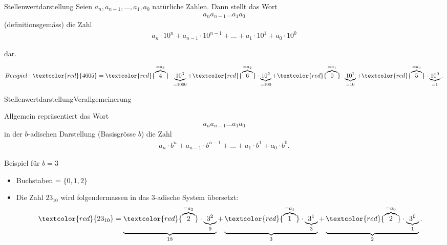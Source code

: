 \begin{frame}{Stellenwertdarstellung}
    Seien $a_n,a_{n-1},\ldots,a_1,a_0$ natürliche Zahlen. Dann stellt das Wort
    \begin{align*}
        a_na_{n-1}\ldots a_1a_0
    \end{align*}
    (definitionsgemäss) die Zahl
    \begin{align*}
        a_n\cdot 10^n + a_{n-1}\cdot 10^{n-1}+\ldots + a_1\cdot 10^1 + a_0\cdot 10^0
    \end{align*}

    dar.

    
\begin{align*}
    Beispiel: \textcolor{red}{4605} = \textcolor{red}{\overbrace{4}^{=a_3}}\cdot \underbrace{10^3}_{=1000} + \textcolor{red}{\overbrace{6}^{=a_2}}\cdot \underbrace{10^2}_{=100} + \textcolor{red}{\overbrace{0}^{=a_1}}\cdot \underbrace{10^1}_{=10} + \textcolor{red}{\overbrace{5}^{=a_0}}\cdot \underbrace{10^0}_{=1}.
\end{align*}

\end{frame}



\begin{frame}{Stellenwertdarstellung}{Verallgemeinerung}

Allgemein repräsentiert das Wort
    \begin{align*}
        a_na_{n-1}\ldots a_1a_0
    \end{align*}
    in der $b$-adischen Darstellung (Basisgrösse $b$) die Zahl
    \begin{align*}
        a_n\cdot b^n + a_{n-1}\cdot b^{n-1}+\ldots + a_1\cdot b^1 + a_0\cdot b^0.
    \end{align*}

    Beispiel für $b = 3$
    \begin{itemize}
        \item Buchstaben = $\{0,1,2\}$
        \item Die Zahl $23_{10}$ wird folgendermassen in das 3-adische System übersetzt:
        \begin{align*}
        \textcolor{red}{23_{10}}=\underbrace{\textcolor{red}{\overbrace{2}^{=a_2}}\cdot \underbrace{3^2}_{9}}_{18} + \underbrace{\textcolor{red}{\overbrace{1}^{=a_1}}\cdot \underbrace{3^1}_{3}}_{3} + \underbrace{\textcolor{red}{\overbrace{2}^{=a_0}}\cdot \underbrace{3^0}_{1}}_{2}.
    \end{align*}
    \end{itemize}
    
 \end{frame}

